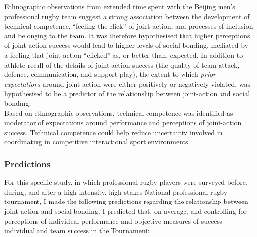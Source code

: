 \documentclass[12pt]{report}
\begin{document}
Ethnographic observations from extended time spent with the Beijing men’s professional rugby team suggest a strong association between the development of technical competence, ``feeling the click'' of joint-action, and processes of inclusion and belonging to the team. It was therefore hypothesised that higher perceptions of joint-action success would lead to higher levels of social bonding, mediated by a feeling that joint-action ``clicked'' as, or better than, expected. In addition to athlete recall of the details of joint-action success (the quality of team attack, defence, communication, and support play), the extent to which \textit{prior expectations} around joint-action were either positively or negatively violated, was hypothesised to be a predictor of the relationship between joint-action and social bonding.\\

Based on ethnographic observations, technical competence was identified as moderator of expectations around performance and perceptions of joint-action success. Technical competence could help reduce uncertainty involved in coordinating in competitive interactional sport environments. \\


\subsubsection{Predictions}
For this specific study, in which professional rugby players were surveyed before, during, and after a high-intensity, high-stakes National professional rugby tournament, I made the following predictions regarding the relationship between joint-action and social bonding. I predicted that, on average, and controlling for perceptions of individual performance and objective measures of success individual and team success in the Tournament:
\end{document}
